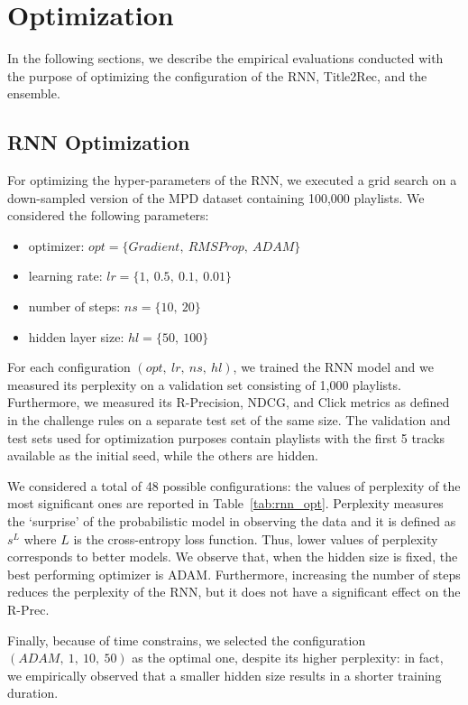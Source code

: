 \section{Optimization}
\label{sec:optimization}
In the following sections, we describe the empirical evaluations conducted with the purpose of optimizing the configuration of the RNN, Title2Rec, and the ensemble.

\subsection{RNN Optimization}
\label{sec:rnn-opt}
For optimizing the hyper-parameters of the RNN, we executed a grid search on a down-sampled version of the MPD dataset containing 100,000 playlists. We considered the following parameters:
\begin{itemize}
    \item optimizer: $opt = \{Gradient,\ RMSProp,\ ADAM\}$
    \item learning rate: $lr = \{1,\ 0.5,\ 0.1,\ 0.01\}$
    \item number of steps: $ns = \{10,\ 20\}$
    \item hidden layer size: $hl = \{50,\ 100\}$ 
\end{itemize}

For each configuration $(opt,\ lr,\ ns,\ hl)$, we trained the RNN model and we measured its perplexity on a validation set consisting of 1,000 playlists. Furthermore, we measured its R-Precision, NDCG, and Click metrics as defined in the challenge rules on a separate test set of the same size. The validation and test sets used for optimization purposes contain playlists with the first 5 tracks available as the initial seed, while the others are hidden.

We considered a total of 48 possible configurations: the values of perplexity of the most significant ones are reported in Table~\ref{tab:rnn_opt}. Perplexity measures the `surprise' of the probabilistic model in observing the data and it is defined as $s^{L}$ where $L$ is the cross-entropy loss function. Thus, lower values of perplexity corresponds to better models. We observe that, when the hidden size is fixed, the best performing optimizer is ADAM. Furthermore, increasing the number of steps reduces the perplexity of the RNN, but it does not have a significant effect on the R-Prec.

Finally, because of time constrains, we selected the configuration $(ADAM,\ 1,\ 10,\ 50)$ as the optimal one, despite its higher perplexity: in fact, we empirically observed that a smaller hidden size results in a shorter training duration.

